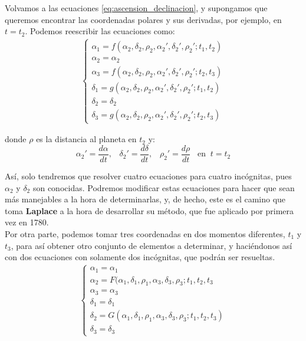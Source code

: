 Volvamos a las ecuaciones \eqref{eq:ascension_declinacion}, y supongamos que queremos encontrar las coordenadas polares y sus derivadas, por ejemplo, en $t=t_2$. Podemos reescribir las ecuaciones como:
\begin{align}
\left\{\begin{array}{l}
	\alpha_1 = f(\alpha_2, \delta_2, \rho_2, \alpha_2', \delta_2', \rho_2'; t_1, t_2)\\ 
	\alpha_2 = \alpha_2\\
	\alpha_3 = f(\alpha_2, \delta_2, \rho_2, \alpha_2', \delta_2', \rho_2'; t_2, t_3)\\
	\delta_1 = g(\alpha_2, \delta_2, \rho_2, \alpha_2', \delta_2', \rho_2'; t_1, t_2)\\
	\delta_2 = \delta_2\\
	\delta_3 = g(\alpha_2, \delta_2, \rho_2, \alpha_2', \delta_2', \rho_2'; t_2, t_3)
\end{array}
\right.
\label{eq:idea_laplace}
\end{align}

\noindent donde $\rho$ es la distancia al planeta en $t_2$ y:
\[
\alpha_2'=\frac{d\alpha}{dt}, \; \; \; \delta_2'=\frac{d\delta}{dt}, \; \; \; \rho_2'=\frac{d\rho}{dt} \; \; \;  \text{en} \; \; t=t_2
\]

Así, solo tendremos que resolver cuatro ecuaciones para cuatro incógnitas, pues $\alpha_2$ y $\delta_2$ son conocidas. Podremos modificar estas ecuaciones para hacer que sean más manejables a la hora de determinarlas, y, de hecho, este es el camino que toma \textbf{Laplace} a la hora de desarrollar su método, que fue aplicado por primera vez en 1780.\\

Por otra parte, podemos tomar tres coordenadas en dos momentos diferentes, $t_1$ y $t_3$, para así obtener otro conjunto de elementos a determinar, y haciéndonos así con dos ecuaciones con solamente dos incógnitas, que podrán ser resueltas.
\begin{align}
\left\{\begin{array}{l}
	\alpha_1 = \alpha_1\\
	\alpha_2 = F(\alpha_1, \delta_1, \rho_1, \alpha_3, \delta_3, \rho_3; t_1, t_2, t_3\\
	\alpha_3 = \alpha_3\\
	\delta_1 = \delta_1\\
	\delta_2 = G(\alpha_1, \delta_1, \rho_1, \alpha_3, \delta_3, \rho_3; t_1, t_2, t_3)\\
	\delta_3 = \delta_3
\end{array}
\right.
\label{eq:camino_gauss}
\end{align}

